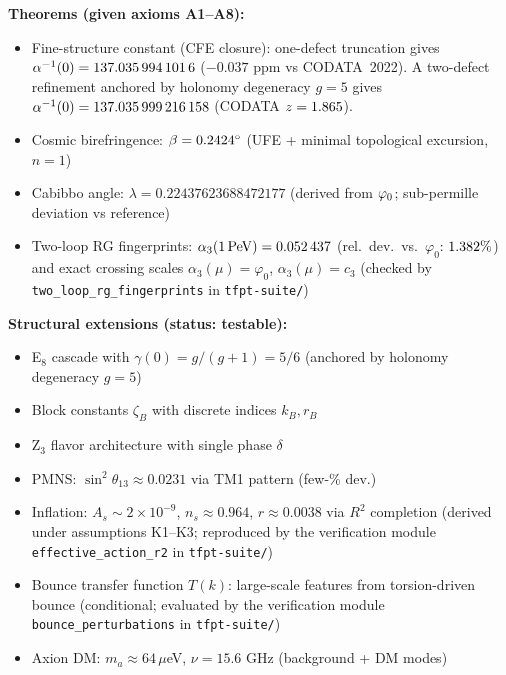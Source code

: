 \vspace{1em}
\begin{tcolorbox}[colback=gray!5, colframe=gray!60, title={\textbf{Claim Map: What This Paper Establishes}}, fonttitle=\bfseries]
\textbf{Theorems (given axioms A1--A8):}
\begin{itemize}[leftmargin=1.5em, topsep=2pt, itemsep=1pt]
    \item Fine-structure constant (CFE closure): one-defect truncation gives $\alpha^{-1}(0)=\num[round-mode=places,round-precision=10]{\TFPTalphaInvSelfNum}$ ($-0.037$ ppm vs CODATA~2022). A two-defect refinement anchored by holonomy degeneracy $g=5$ gives $\alpha^{-1}(0)=\num[round-mode=places,round-precision=12]{\TFPTalphaInvGOverFourNum}$ (CODATA $z=\num[round-mode=places,round-precision=3]{\TFPTalphaZGOverFourNum}$).
    \item Cosmic birefringence: $\beta = \num[round-mode=places,round-precision=4]{\TFPTbetaDegNum}^\circ$ (UFE + minimal topological excursion, $n=1$)
    \item Cabibbo angle: $\lambda = \num[round-mode=places,round-precision=6]{0.22437623688472177}$ (derived from $\varphi_0$; sub-permille deviation vs reference)
    \item Two-loop RG fingerprints: $\alpha_3(1\,\mathrm{PeV})=\num[round-mode=places,round-precision=6]{\TFPTalphaThreePeVNum}$ (rel.\ dev.\ vs.\ $\varphi_0$: $\num[round-mode=places,round-precision=3]{\TFPTalphaThreePeVRelDevPercent}\%$) and exact crossing scales $\alpha_3(\mu)=\varphi_0$, $\alpha_3(\mu)=c_3$ (checked by \texttt{two\_loop\_rg\_fingerprints} in \texttt{tfpt-suite/})
\end{itemize}

\textbf{Structural extensions (status: testable):}
\begin{itemize}[leftmargin=1.5em, topsep=2pt, itemsep=1pt]
    \item E$_8$ cascade with $\gamma(0)=g/(g+1)=5/6$ (anchored by holonomy degeneracy $g=5$)
    \item Block constants $\zeta_B$ with discrete indices $k_B, r_B$
    \item Z$_3$ flavor architecture with single phase $\delta$
    \item PMNS: $\sin^2\theta_{13} \approx 0.0231$ via TM1 pattern (few-\% dev.)
    \item Inflation: $A_s \sim 2\times10^{-9}$, $n_s \approx 0.964$, $r \approx 0.0038$ via $R^2$ completion (derived under assumptions K1--K3; reproduced by the verification module \texttt{effective\_action\_r2} in \texttt{tfpt-suite/})
    \item Bounce transfer function $T(k)$: large-scale features from torsion-driven bounce (conditional; evaluated by the verification module \texttt{bounce\_perturbations} in \texttt{tfpt-suite/})
    \item Axion DM: $m_a \approx 64\,\mu$eV, $\nu = 15.6$ GHz (background + DM modes)
\end{itemize}


\end{tcolorbox}
